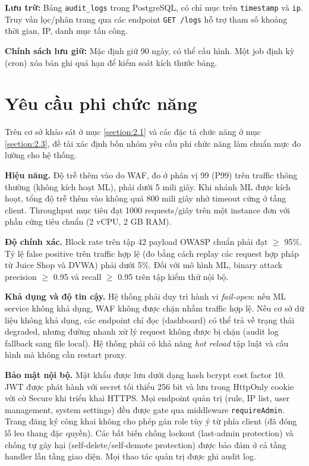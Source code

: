 \documentclass[../DoAn.tex]{subfiles}
\begin{document}
\textbf{Lưu trữ:} Bảng \texttt{audit\_logs} trong PostgreSQL, có chỉ mục trên
\texttt{timestamp} và \texttt{ip}. Truy vấn lọc/phân trang qua các endpoint
\texttt{GET /logs} hỗ trợ tham số khoảng thời gian, IP, danh mục tấn công.

\textbf{Chính sách lưu giữ:} Mặc định giữ 90 ngày, có thể cấu hình. Một job
định kỳ (cron) xóa bản ghi quá hạn để kiểm soát kích thước bảng.

\section{Yêu cầu phi chức năng}
\label{section:2.4}

Trên cơ sở khảo sát ở mục \ref{section:2.1} và các đặc tả chức năng ở mục
\ref{section:2.3}, đề tài xác định bốn nhóm yêu cầu phi chức năng làm chuẩn
mực đo lường cho hệ thống.

\textbf{Hiệu năng.} Độ trễ thêm vào do WAF, đo ở phân vị 99 (P99) trên traffic
thông thường (không kích hoạt ML), phải dưới 5 mili giây. Khi nhánh ML được
kích hoạt, tổng độ trễ thêm vào không quá 800 mili giây nhờ timeout cứng ở
tầng client. Throughput mục tiêu đạt 1000 requests/giây trên một instance đơn
với phần cứng tiêu chuẩn (2 vCPU, 2 GB RAM).

\textbf{Độ chính xác.} Block rate trên tập 42 payload OWASP chuẩn phải đạt
\(\ge\) 95\%. Tỷ lệ false positive trên traffic hợp lệ (đo bằng cách replay
các request hợp pháp từ Juice Shop và DVWA) phải dưới 5\%. Đối với mô hình
ML, binary attack precision \(\ge\) 0.95 và recall \(\ge\) 0.95 trên tập kiểm
thử nội bộ.

\textbf{Khả dụng và độ tin cậy.} Hệ thống phải duy trì hành vi \textit{fail-open}:
nếu ML service không khả dụng, WAF không được chặn nhầm traffic hợp lệ. Nếu
cơ sở dữ liệu không khả dụng, các endpoint chỉ đọc (dashboard) có thể trả về
trạng thái degraded, nhưng đường nhanh xử lý request không được bị chặn (audit
log fallback sang file local). Hệ thống phải có khả năng \textit{hot reload}
tập luật và cấu hình mà không cần restart proxy.

\textbf{Bảo mật nội bộ.} Mật khẩu được lưu dưới dạng hash bcrypt cost factor
10. JWT được phát hành với secret tối thiểu 256 bit và lưu trong HttpOnly
cookie với cờ Secure khi triển khai HTTPS. Mọi endpoint quản trị (rule, IP
list, user management, system settings) đều được gate qua middleware
\texttt{requireAdmin}. Trang đăng ký công khai không cho phép gán role tùy
ý từ phía client (đã đóng lỗ leo thang đặc quyền). Các bất biến chống lockout
(last-admin protection) và chống tự gây hại (self-delete/self-demote
protection) được bảo đảm ở cả tầng handler lẫn tầng giao diện. Mọi thao tác
quản trị được ghi audit log.
\end{document}
